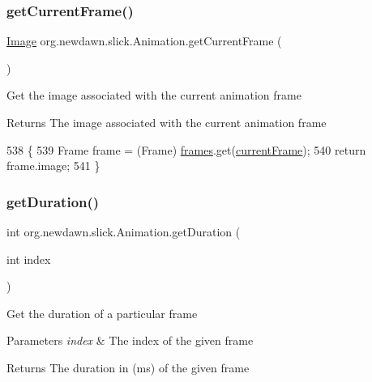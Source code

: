 \subsubsection{\texorpdfstring{get\+Current\+Frame()}{getCurrentFrame()}}
{\footnotesize\ttfamily \mbox{\hyperlink{classorg_1_1newdawn_1_1slick_1_1_image}{Image}} org.\+newdawn.\+slick.\+Animation.\+get\+Current\+Frame (\begin{DoxyParamCaption}{ }\end{DoxyParamCaption})\hspace{0.3cm}{\ttfamily [inline]}}

Get the image associated with the current animation frame

\begin{DoxyReturn}{Returns}
The image associated with the current animation frame 
\end{DoxyReturn}

\begin{DoxyCode}
538                                    \{
539         Frame frame = (Frame) \mbox{\hyperlink{classorg_1_1newdawn_1_1slick_1_1_animation_a39f0c6a16e479985b22f7dd3bb781bf7}{frames}}.get(\mbox{\hyperlink{classorg_1_1newdawn_1_1slick_1_1_animation_a358e1f2b9d9a05f83a416405e6bcd332}{currentFrame}});
540         \textcolor{keywordflow}{return} frame.image;
541     \}
\end{DoxyCode}
\mbox{\label{classorg_1_1newdawn_1_1slick_1_1_animation_a5e51e58072497b8180288c240fc7a763}} 
\subsubsection{\texorpdfstring{get\+Duration()}{getDuration()}}
{\footnotesize\ttfamily int org.\+newdawn.\+slick.\+Animation.\+get\+Duration (\begin{DoxyParamCaption}\item[{int}]{index }\end{DoxyParamCaption})\hspace{0.3cm}{\ttfamily [inline]}}

Get the duration of a particular frame


\begin{DoxyParams}{Parameters}
{\em index} & The index of the given frame \\
\hline
\end{DoxyParams}
\begin{DoxyReturn}{Returns}
The duration in (ms) of the given frame 
\end{DoxyReturn}

